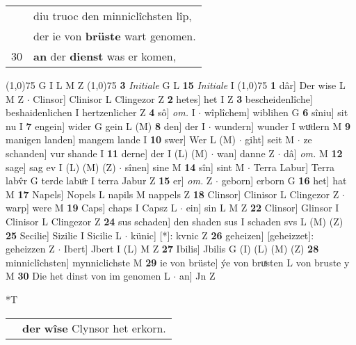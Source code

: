 \documentclass[8pt,a4paper,notitlepage]{article}
\begin{document}
\begin{table}[ht]
\begin{minipage}[t]{0.5\linewidth}
\begin{tabular}{rl}
 & diu truoc den minniclîchsten lîp,\\ 
 & der ie von \textbf{brüste} wart genomen.\\ 
30 & \textbf{an} der \textbf{dienst} was er komen,\\ 
\end{tabular}
\scriptsize
\line(1,0){75} \newline
G I L M Z \newline
\line(1,0){75} \newline
\textbf{3} \textit{Initiale} G L  \textbf{15} \textit{Initiale} I  \newline
\line(1,0){75} \newline
\textbf{1} dâr] Der wise L M Z  $\cdot$ Clinsor] Clinisor L Clingezor Z \textbf{2} hetes] het I Z \textbf{3} bescheidenlîche] beshaidenlichen I hertzenlicher Z \textbf{4} sô] \textit{om.} I  $\cdot$ wîplîchem] wiblihen G \textbf{6} sîniu] sit nu I \textbf{7} engein] wider G gein L (M) \textbf{8} den] der I  $\cdot$ wundern] wunder I wuͦdern M \textbf{9} manigen landen] mangem lande I \textbf{10} swer] Wer L (M)  $\cdot$ giht] seit M  $\cdot$ ze schanden] vur shande I \textbf{11} derne] der I (L) (M)  $\cdot$ wan] danne Z  $\cdot$ dâ] \textit{om.} M \textbf{12} sage] sag ev I (L) (M) (Z)  $\cdot$ sînen] sine M \textbf{14} sîn] sint M  $\cdot$ Terra Labur] Terra labv̂r G terde labuͦr I terra Jabur Z \textbf{15} er] \textit{om.} Z  $\cdot$ geborn] erborn G \textbf{16} het] hat M \textbf{17} Napels] Nopels L napils M nappels Z \textbf{18} Clinsor] Clinisor L Clingezor Z  $\cdot$ warp] were M \textbf{19} Caps] chaps I Capsz L  $\cdot$ ein] sin L M Z \textbf{22} Clinsor] Glinsor I Clinisor L Clingezor Z \textbf{24} sus schaden] den shaden sus I schaden svs L (M) (Z) \textbf{25} Secilie] Sizilie I Sicilie L  $\cdot$ künic] [*]: kvnic Z \textbf{26} geheizen] [geheizzet]: geheizzen Z  $\cdot$ Ibert] Jbert I (L) M Z \textbf{27} Ibilis] Jbilis G (I) (L) (M) (Z) \textbf{28} minniclîchsten] mynniclichste M \textbf{29} ie von brüste] ýe von bruͯsten L von bruste y M \textbf{30} Die het dinst von im genomen L  $\cdot$ an] Jn Z \newline
\end{minipage}
\hspace{0.5cm}
\begin{minipage}[t]{0.5\linewidth}
\small
\begin{center}*T
\end{center}
\begin{tabular}{rl}
 & \textbf{der} \textbf{wîse} Clynsor het erkorn.\\ 

\end{tabular}
\end{minipage}
\end{table}
\end{document}
